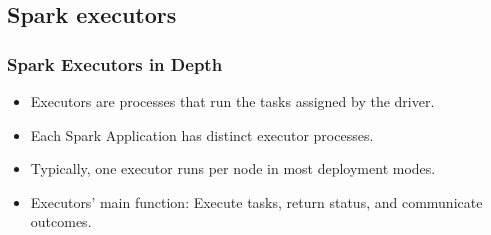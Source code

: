 
\subsection{Spark executors}\label{subsec:spark-executors}

\begin{frame}
    \frametitle{Spark Executors in Depth}
    \begin{itemize}
        \item Executors are processes that run the tasks assigned by the driver.
        \item Each Spark Application has distinct executor processes.
        \item Typically, one executor runs per node in most deployment modes.
        \item Executors' main function: Execute tasks, return status, and communicate outcomes.
    \end{itemize}
\end{frame}

